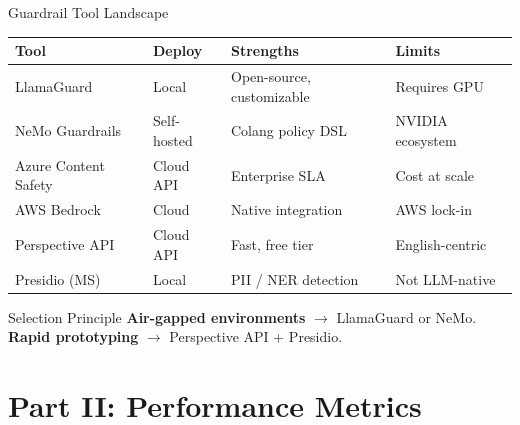 \documentclass{beamer}       %
\begin{document}
\begin{frame}{Guardrail Tool Landscape}
    \footnotesize
    \begin{table}
        \centering
        \begin{tabular}{@{}p{2.2cm}p{1.8cm}p{2.5cm}p{2.2cm}@{}}
            \toprule
            \textbf{Tool} & \textbf{Deploy} & \textbf{Strengths} & \textbf{Limits} \\
            \midrule
            LlamaGuard & Local & Open-source, customizable & Requires GPU \\[2pt]
            NeMo Guardrails & Self-hosted & Colang policy DSL & NVIDIA ecosystem \\[2pt]
            Azure Content Safety & Cloud API & Enterprise SLA & Cost at scale \\[2pt]
            AWS Bedrock & Cloud & Native integration & AWS lock-in \\[2pt]
            Perspective API & Cloud API & Fast, free tier & English-centric \\[2pt]
            Presidio (MS) & Local & PII / NER detection & Not LLM-native \\
            \bottomrule
        \end{tabular}
    \end{table}
    \vfill
    \begin{block}{Selection Principle}
        \small \textbf{Air-gapped environments} $\rightarrow$ LlamaGuard or NeMo. \hfill
        \textbf{Rapid prototyping} $\rightarrow$ Perspective API + Presidio.
    \end{block}
\end{frame}

\section{Part II: Performance Metrics}
\end{document}
